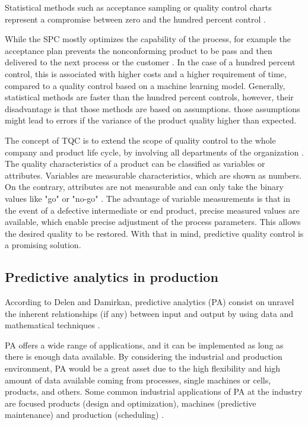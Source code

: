 \documentclass[5p,times,procedia]{elsarticle}
\begin{document}

Statistical methods such as acceptance sampling or quality control charts represent a compromise between zero and the hundred percent control \cite{selvamuthu2018introduction, kurniati2015quality}.

While the SPC mostly optimizes the capability of the process, for example the acceptance plan prevents the nonconforming product to be pass and then delivered to the next process or the customer \cite{kurniati2015quality}.
In the case of a hundred percent control, this is associated with higher costs and a higher requirement of time, compared to a quality control based on a machine learning model.
Generally, statistical methods are faster than the hundred percent controls, however, their disadvantage is that those methods are based on assumptions. those assumptions might lead to errors if the variance of the product quality higher than expected.

The concept of TQC is to extend the scope of quality control to the whole company and product life cycle, by involving all departments of the organization \cite{illes2017new}.
The quality characteristics of a product can be classified as variables or attributes.
Variables are measurable characteristics, which are shown as numbers. On the contrary, attributes are not measurable and can only take the binary values like "go" or "no-go" \cite{mitra2016fundamentals}. 
The advantage of variable measurements is that in the event of a defective intermediate or end product, precise measured values are available, which enable precise adjustment of the process parameters. 
This allows the desired quality to be restored. With that in mind, predictive quality control is a promising solution.

\subsection{Predictive analytics in production}

According to Delen and Damirkan, predictive analytics (PA) consist on unravel the inherent relationships (if any) between input and output by using data and mathematical techniques \cite{delen2013data}.

PA offers a wide range of applications, and it can be implemented as long as there is enough data available. By considering the industrial and production environment, PA would be a great asset due to the high flexibility and high amount of data available coming from processes, single machines or cells, products, and others. Some common industrial applications of PA at the industry are focused products (design and optimization), machines (predictive maintenance) and production (scheduling) \cite{krauss2019machine}.
\end{document}
